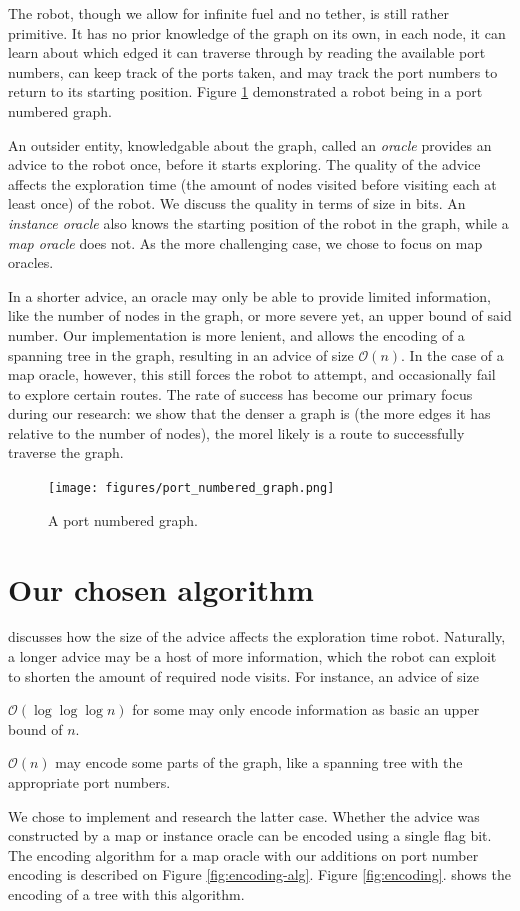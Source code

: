 \documentclass{article}
\begin{document}
The robot, though we allow for infinite fuel and no tether, is still rather primitive. It has no prior knowledge of the graph on its own, in each node, it can learn about which edged it can traverse through by reading the available port numbers, can keep track of the ports taken, and may track the port numbers to return to its starting position. Figure \ref{fig:port-numbered-graph} demonstrated a robot being in a port numbered graph.

An outsider entity, knowledgable about the graph, called an \textit{oracle} provides an advice to the robot once, before it starts exploring. The quality of the advice affects the exploration time (the amount of nodes visited before visiting each at least once) of the robot. We discuss the quality in terms of size in bits. An \textit{instance oracle} also knows the starting position of the robot in the graph, while a \textit{map oracle} does not. As the more challenging case, we chose to focus on map oracles.

In a shorter advice, an oracle may only be able to provide limited information, like the number of nodes in the graph, or more severe yet, an upper bound of said number. Our implementation is more lenient, and allows the encoding of a spanning tree in the graph, resulting in an advice of size $\mathcal{O}(n)$. In the case of a map oracle, however, this still forces the robot to attempt, and occasionally fail to explore certain routes. The rate of success has become our primary focus during our research: we show that the denser a graph is (the more edges it has relative to the number of nodes), the morel likely is a route to successfully traverse the graph.

\begin{figure}
  \centering
  \texttt{[image: figures/port\_numbered\_graph.png]}
  \caption{A port numbered graph.}
  \label{fig:port-numbered-graph}
\end{figure}

\section{Our chosen algorithm}
\label{sec:algorithm}

\cite{gorain2018deterministic} discusses how the size of the advice affects the exploration time robot. Naturally, a longer advice may be a host of more information, which the robot can exploit to shorten the amount of required node visits. For instance, an advice of size
\begin{compactitem}
  \item $\mathcal{O}(\log\log\log n)$ for some may only encode information as basic an upper bound of $n$.
  \item $\mathcal{O}(n)$ may encode some parts of the graph, like a spanning tree with the appropriate port numbers.
\end{compactitem}
We chose to implement and research the latter case. Whether the advice was constructed by a map or instance oracle can be encoded using a single flag bit. The encoding algorithm for a map oracle with our additions on port number encoding is described on Figure \ref{fig:encoding-alg}. Figure \ref{fig:encoding}. shows the encoding of a tree with this algorithm.
\end{document}
